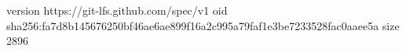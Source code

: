 version https://git-lfs.github.com/spec/v1
oid sha256:fa7d8b145676250bf46ae6ae899f16a2c995a79faf1e3be7233528fac0aaee5a
size 2896
